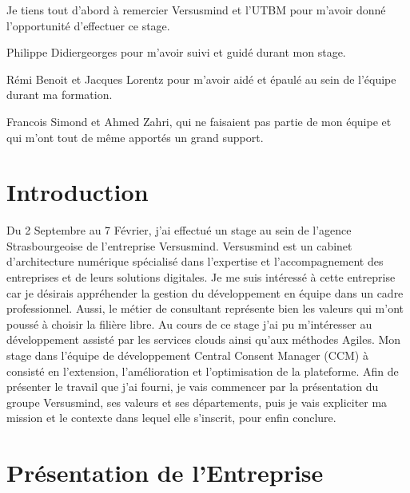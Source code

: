 \documentclass[12pt, a4paper]{report}
\begin{document}
\makeutbmfrontcover{}
Je tiens tout d'abord à remercier Versusmind et l'UTBM pour m'avoir donné l'opportunité d'effectuer ce stage.\newline

Philippe Didiergeorges pour m'avoir suivi et guidé durant mon stage.\newline

Rémi Benoit et Jacques Lorentz pour m'avoir aidé et épaulé au sein de l'équipe durant ma formation.\newline

Francois Simond et Ahmed Zahri, qui ne faisaient pas partie de mon équipe et qui m'ont tout de même apportés un grand support.
\newpage
\tableofcontents
\chapter{Introduction}
Du 2 Septembre au 7 Février, j'ai effectué un stage au sein de l'agence Strasbourgeoise de l'entreprise Versusmind.\newline
Versusmind est un cabinet d'architecture numérique spécialisé dans l'expertise et l'accompagnement des entreprises et de leurs solutions digitales.\newline
Je me suis intéressé à cette entreprise car je désirais appréhender la gestion du développement en équipe dans un cadre professionnel.
Aussi, le métier de consultant représente bien les valeurs qui m'ont poussé à choisir la filière libre.\newline
Au cours de ce stage j'ai pu m'intéresser au développement assisté par les services clouds ainsi qu'aux méthodes Agiles.\newline
Mon stage dans l'équipe de développement Central Consent Manager (CCM) à consisté en l'extension, l'amélioration et l'optimisation de la plateforme.\newline
Afin de présenter le travail que j'ai fourni, je vais commencer par la présentation du groupe Versusmind, ses valeurs et ses départements, puis je vais expliciter ma mission et le contexte dans lequel elle s'inscrit, pour enfin conclure.
\chapter{Présentation de l’Entreprise}
\end{document}

